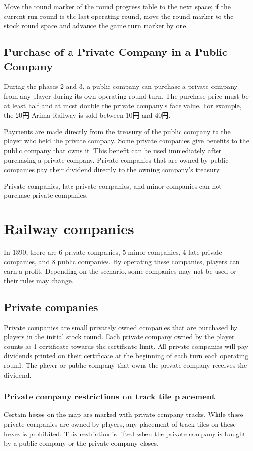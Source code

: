 \documentclass{article}
\begin{document}
\begin{CJK}{UTF8}{min}
\begin{multicols}{2}
Move the round marker of the round progress table to the next space;
if the current run round is the last operating round, move the round marker
to the stock round space and advance the game turn marker by one.

\subsection{Purchase of a Private Company in a Public Company}
\label{or-private-purchase}
During the phases 2 and 3, a public company can purchase a private
company from any player during its own operating round turn.  The
purchase price must be at least half and at most double the private
company's face value. For example, the 20円 Arima Railway is sold
between 10円 and 40円.

Payments are made directly from the treasury of the public company to
the player who held the private company. Some private companies give
benefits to the public company that owns it. This benefit can be used
immediately after purchasing a private company. Private companies that
are owned by public companies pay their dividend directly to the
owning company's treasury.

Private companies, late private companies, and minor companies can
not purchase private companies.


\section{Railway companies}
In 1890, there are 6 private companies, 5 minor companies, 4 late private
companies, and 8 public companies. By operating these companies,
players can earn a profit. Depending on the scenario, some companies
may not be used or their rules may change.

\subsection{Private companies}
Private companies are small privately owned companies that are
purchased by players in the initial stock round. Each private company
owned by the player counts as 1 certificate towards the certificate
limit. All private companies will pay dividends printed on their
certificate at the beginning of each turn each operating round. The
player or public company that owns the private company receives the
dividend.

\subsubsection{Private company restrictions on track tile placement}
Certain hexes on the map are marked with private company tracks. While
these private companies are owned by players, any placement of track
tiles on these hexes is prohibited. This restriction is lifted when
the private company is bought by a public company or the private
company closes.


\end{multicols}
\end{CJK}
\end{document}
